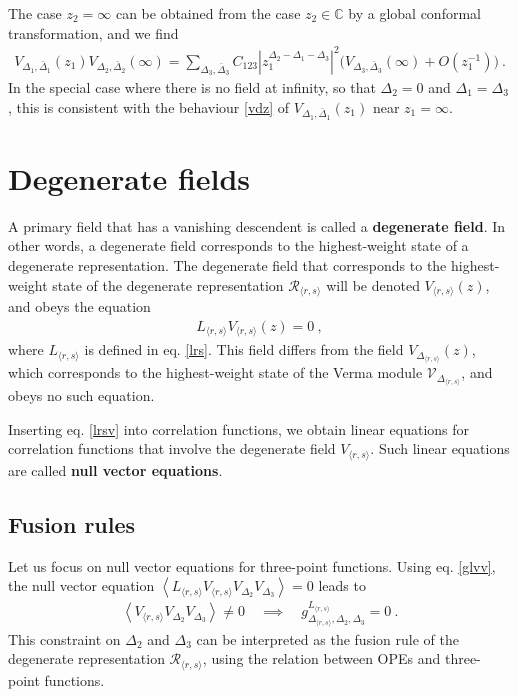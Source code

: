 \documentclass[12pt, a4paper, notitlepage, twoside]{report}
\numberwithin{equation}{section}
\theoremstyle{break}
\begin{document}
The case $z_2=\infty$ can be obtained from the case $z_2\in\mathbb{C}$ by a global conformal transformation, and we find 
\begin{align}
 V_{\Delta_1,\bar\Delta_1}(z_1) V_{\Delta_2,\bar\Delta_2}(\infty) =  \sum_{\Delta_3,\bar\Delta_3}C_{123}\left| z_1^{\Delta_2-\Delta_1-\Delta_3}\right|^2 \Big( V_{\Delta_3,\bar\Delta_3}(\infty) + O\left(z_1^{-1}\right)\Big) \ .
 \label{iope}
\end{align}
In the special case where there is no field at infinity, so that $\Delta_2=0$ and $\Delta_1=\Delta_3$, this is consistent with the behaviour \eqref{vdz} of $V_{\Delta_1,\bar\Delta_1}(z_1)$ near $z_1=\infty$.


\section{Degenerate fields}\label{sec:degf}

A primary field that has a vanishing descendent is called a \textbf{\boldmath degenerate field}.
In other words, a degenerate field corresponds to the highest-weight state of a degenerate representation.
The degenerate field that corresponds to the highest-weight state of the degenerate representation $\mathcal{R}_{\langle r,s \rangle}$ will be denoted $V_{\langle r,s\rangle}(z)$, and obeys the equation 
\begin{align}
 L_{\langle r,s \rangle} V_{\langle r,s \rangle}(z) = 0 \ , 
\label{lrsv}
\end{align}
where $L_{\langle r,s \rangle}$ is defined in eq. \eqref{lrs}.
This field differs from the field $V_{\Delta_{\langle r,s \rangle}}(z)$, which corresponds to the highest-weight state of the Verma module $\mathcal{V}_{\Delta_{\langle r,s \rangle}}$, and obeys no such equation.

Inserting eq. \eqref{lrsv} into correlation functions, we obtain linear equations for correlation functions that involve the degenerate field $V_{\langle r,s\rangle}$. Such linear equations are called \textbf{\boldmath null vector equations}. 

\subsection{Fusion rules}\label{secfr}

Let us focus on null vector equations for three-point functions. 
Using eq. \eqref{glvv},
the null vector equation $\left< L_{\langle r,s \rangle} V_{\langle r,s \rangle} V_{\Delta_2}V_{\Delta_3}\right>=0$ leads to
\begin{align}
 \left< V_{\langle r,s \rangle} V_{\Delta_2}V_{\Delta_3}\right>\neq 0 \quad \implies \quad g^{L_{\langle r,s \rangle}}_{\Delta_{\langle r,s \rangle},\Delta_2,\Delta_3} = 0 \ .
\end{align}
This constraint on $\Delta_2$ and $\Delta_3$ can be interpreted as the fusion rule of the degenerate representation $\mathcal{R}_{\langle r,s \rangle}$, using the relation between OPEs and three-point functions.
\end{document}
